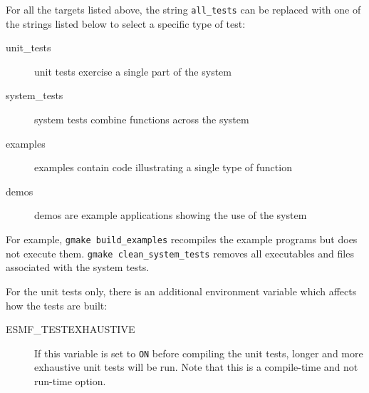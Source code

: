 For all the targets listed above, the string {\tt all\_tests} can be
replaced with one of the strings listed below to select a
specific type of test:
\begin{description}
\item[unit\_tests] unit tests exercise a single part of the system
\item[system\_tests] system tests combine functions across the system
\item[examples] examples contain code illustrating a single type of function
\item[demos] demos are example applications showing the use of the system
\end{description}
For example, {\tt gmake build\_examples} recompiles the example programs but 
does not execute them.  {\tt gmake clean\_system\_tests} removes all
executables and files associated with the system tests.

For the unit tests only, there is an additional environment variable
which affects how the tests are built:
\begin{description}
\item[ESMF\_TESTEXHAUSTIVE]
If this variable is set to {\tt ON} before compiling the unit tests,
longer and more exhaustive unit tests will be run.  Note that this is a
compile-time and not run-time option.
\end{description}

